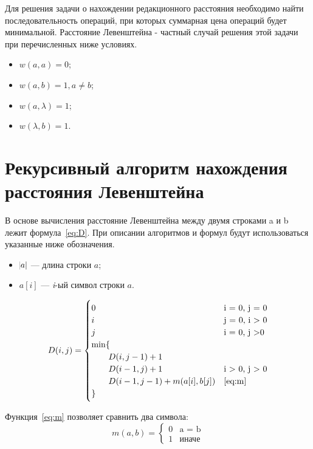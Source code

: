 \documentclass[12pt]{report}
\begin{document}
    Для решения задачи о нахождении редакционного расстояния необходимо найти последовательность операций, при которых
    суммарная цена операций будет минимальной. Расстояние Левенштейна - частный случай решения этой задачи
    при перечисленных ниже условиях.
    \begin{itemize}
        \item $w(a, a) = 0$;
        \item $w(a, b) = 1, a \neq b$;
        \item $w(a, \lambda) = 1$;
        \item $w(\lambda, b) = 1$.
    \end{itemize}


    \section{Рекурсивный алгоритм нахождения расстояния Левенштейна}\label{sec:ReccursiveLev}
    В основе вычисления расстояние Левенштейна между двумя строками a и b лежит формула~\ref{eq:D}.
    При описании алгоритмов и формул будут использоваться указанные ниже обозначения.
    \begin{itemize}
        \item $\abs{a}$ --- длина строки $a$;
        \item $a[i]$ --- \emph{i}-ый символ строки $a$.
    \end{itemize}

    \begin{equation}
        \label{eq:D}
        D(i, j) = \begin{cases}
                      0 &\text{i = 0, j = 0} \\
                      i &\text{j = 0, i > 0} \\
                      j &\text{i = 0, j >0} \\
                      \min \lbrace \\
                      \qquad D(i, j - 1) + 1 \\
                      \qquad D(i - 1, j) + 1 &\text{i > 0, j > 0} \\
                      \qquad D(i - 1, j - 1) + m(a[i], b[j]) &\text{\ref{eq:m}} \\
                      \rbrace
        \end{cases}
    \end{equation}

    Функция~\ref{eq:m} позволяет сравнить два символа:
    \begin{equation}
        \label{eq:m}
        m(a, b) = \begin{cases}
                      0 &\text{a = b} \\
                      1 &\text{иначе}
        \end{cases}
    \end{equation}
\end{document}
